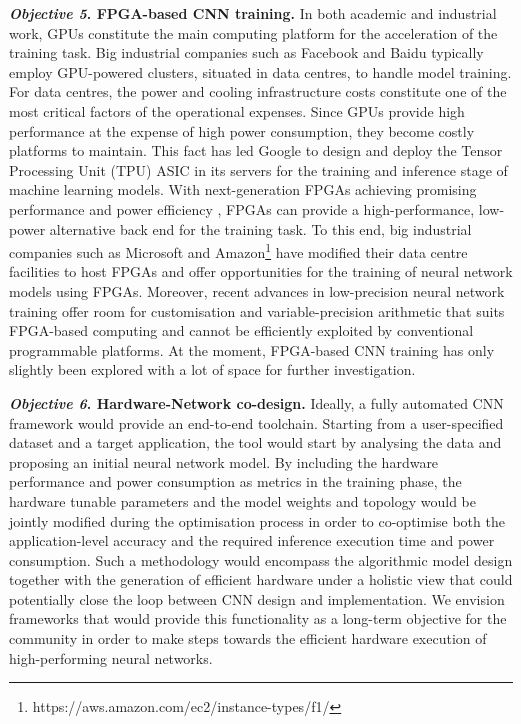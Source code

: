 \documentclass[format=acmsmall, review=false, screen=true]{acmart}
\begin{document}
\textbf{\textit{Objective 5}. FPGA-based CNN training.}
In both academic and industrial work, GPUs constitute the main computing platform for the acceleration of the training task. Big industrial companies such as Facebook and Baidu typically employ GPU-powered clusters, situated in data centres, to handle model training. For data centres, the power and cooling infrastructure costs constitute one of the most critical factors of the operational expenses. Since GPUs provide high performance at the expense of high power consumption, they become costly platforms to maintain. {\color{black}This fact has led Google to design and deploy the Tensor Processing Unit (TPU) ASIC \cite{Jouppi2017} in its servers for the training and inference stage of machine learning models. With next-generation FPGAs achieving promising performance and power efficiency \cite{Nurvitadhi_2017}, FPGAs can provide a high-performance, low-power alternative back end for the training task. To this end, big industrial companies such as Microsoft \cite{Caulfield2016} and Amazon\footnote{https://aws.amazon.com/ec2/instance-types/f1/} have modified their data centre facilities to host FPGAs and offer opportunities for the training of neural network models using FPGAs.} Moreover, recent advances in low-precision neural network training \cite{Zhou_16}\cite{Hubara_16}\cite{asyncsgd2017isca}\cite{Chen_17}\cite{NIPS2017terngrad} offer room for customisation and variable-precision arithmetic that suits FPGA-based computing and cannot be efficiently exploited by conventional programmable platforms. At the moment, FPGA-based CNN training has only slightly been explored \cite{Wenlai_Zhao_2016}\cite{Park2017micro} with a lot of space for further investigation.



\textbf{\textit{Objective 6}. Hardware-Network co-design.}
Ideally, a fully automated CNN framework would provide an end-to-end toolchain. Starting from a user-specified dataset and a target application, the tool would start by analysing the data and proposing an initial neural network model. By including the hardware performance and power consumption as metrics in the training phase, the hardware tunable parameters and the model weights and topology would be jointly modified during the optimisation process in order to co-optimise both the application-level accuracy and the required inference execution time and power consumption. Such a methodology would encompass the algorithmic model %
design %
together with the generation of efficient hardware under a holistic view that could potentially close the loop between CNN design and implementation. We envision frameworks that would provide this functionality as a long-term objective for the community in order to make steps towards the efficient hardware execution of high-performing neural networks.
\end{document}
